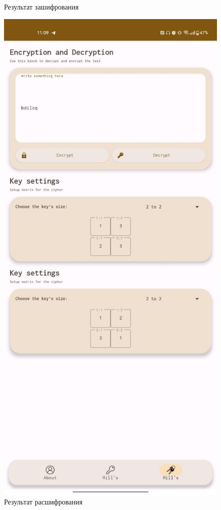 \documentclass[a4paper]{article}
\begin{document}
\begin{figure}[H]
\begin{minipage}{0.3\textwidth}
        \caption{Результат зашифрования}
    \end{minipage}
    \hfill
    \begin{minipage}{0.3\textwidth}
        \centering
        \includegraphics[width=\textwidth]{02_0006}
        \caption{Результат расшифрования}
    \end{minipage}
  \end{figure}
\end{document}
